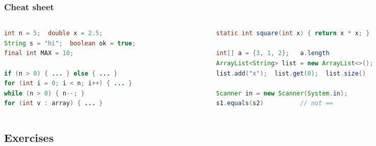 \documentclass[aspectratio=169,10pt,compress]{beamer}
\begin{document}
\begin{frame}[t,fragile] \frametitle{Cheat sheet}
  \begin{columns}[T]
    \begin{column}{0.49\textwidth}


\begin{lstlisting}[language=Java, basicstyle=\ttfamily\scriptsize, frame=single,
                   backgroundcolor=\color{codebg}, rulecolor=\color{gray!40}, numbers=none]
int n = 5;  double x = 2.5;
String s = "hi";  boolean ok = true;
final int MAX = 10;

if (n > 0) { ... } else { ... }
for (int i = 0; i < n; i++) { ... }
while (n > 0) { n--; }
for (int v : array) { ... }
\end{lstlisting}


    \end{column}
    \begin{column}{0.49\textwidth}


\begin{lstlisting}[language=Java, basicstyle=\ttfamily\scriptsize, frame=single,
                   backgroundcolor=\color{codebg}, rulecolor=\color{gray!40}, numbers=none]
static int square(int x) { return x * x; }

int[] a = {3, 1, 2};   a.length
ArrayList<String> list = new ArrayList<>();
list.add("x");  list.get(0);  list.size()

Scanner in = new Scanner(System.in);
s1.equals(s2)          // not ==
\end{lstlisting}


    \end{column}
  \end{columns}
\end{frame}

\subsection[Exercises]{Exercises}
\end{document}
